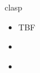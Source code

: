 \begin{frame}{clasp}
  \begin{itemize}
  \item <1-> TBF
  \item {} \ \cite{gekasc09c,gekasc12b,gekakasc12a}
  \item {} \ \cite{nefrle18a}
  \end{itemize}
\end{frame}
%
